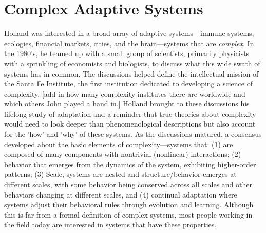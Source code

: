 \section{Complex Adaptive Systems}

Holland was interested in a broad array of adaptive systems---immune systems, ecologies, financial markets, cities, and the brain---systems that are \emph{complex}.  In the 1980's, he teamed up with a small group of scientists, primarily physicists with a sprinkling of economists and biologists, to discuss what this wide swath of systems has in common.  The discussions helped define the intellectual mission of the Santa Fe Institute, the first institution dedicated to developing a science of complexity.  [add in how many complexity institutes there are worldwide and which others John played a hand in.]  Holland brought to these discussions his lifelong study of adaptation and a reminder that true theories about complexity would need to look deeper than phenomenological descriptions but also account for the  'how' and 'why' of these systems.
As the discussions matured, a consensus developed about the basic elements of complexity---systems that: (1)  are composed of many components with nontrivial (nonlinear) interactions; (2) behavior that emerges from the dynamics of the system, exhibiting higher-order patterns; (3) Scale, systems are nested and structure/behavior emerges at different scales, with some behavior being conserved across all scales and other behaviors changing at different scales, and (4) continual adaptation where systems adjust their behavioral rules through evolution and learning.  Although this is far from a formal definition of complex systems, most people working in the field today are interested in systems that have these properties.

